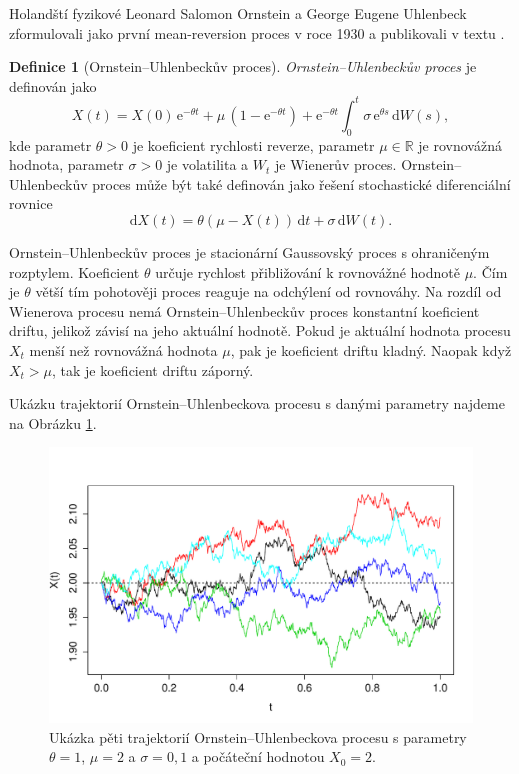 \documentclass[a4paper,12pt]{report}
\theoremstyle{definition} \newtheorem{definice}[veta]{Definice}
\theoremstyle{remark}
\begin{document}
Holandští fyzikové Leonard Salomon Ornstein a George Eugene Uhlenbeck zformulovali jako první mean-reversion proces v roce 1930 a publikovali v textu \cite{OrnsteinUhlenbeck1930}. 

\begin{definice}[Ornstein–Uhlenbeckův proces]
\textit{Ornstein–Uhlenbeckův proces} je definován jako
\begin{equation}\label{OUP}
X(t) = X(0)\,\mathrm{e}^{-\theta t} + \mu\,(1-\mathrm{e}^{-\theta t}) + \mathrm{e}^{-\theta t}\int_0^t \sigma\,\mathrm{e}^{\theta s}\,\mathrm{d}W(s),
\end{equation}
kde parametr $\theta>0$ je koeficient rychlosti reverze, parametr $\mu\in\mathbb{R}$ je rovnovážná hodnota, parametr $\sigma>0$ je volatilita a $W_t$ je Wienerův proces.
Ornstein–Uhlenbeckův proces může být také definován jako řešení stochastické diferenciální rovnice
\begin{equation}\label{SDE_OUP}
\mathrm{d}X(t) = \theta(\mu-X(t))\,\mathrm{d}t + \sigma\,\mathrm{d}W(t).
\end{equation}
\end{definice}

Ornstein–Uhlenbeckův proces je stacionární Gaussovský proces s ohraničeným rozptylem. 
Koeficient $\theta$ určuje rychlost přibližování k rovnovážné hodnotě $\mu$. %
Čím je $\theta$ větší tím pohotověji proces reaguje na odchýlení od rovnováhy. 
Na rozdíl od Wienerova procesu nemá Ornstein–Uhlenbeckův proces konstantní koeficient driftu, jelikož závisí na jeho aktuální hodnotě.
Pokud je aktuální hodnota procesu $X_t$ menší než rovnovážná hodnota $\mu$, pak je koeficient driftu kladný.
Naopak když $X_t>\mu$, tak je koeficient driftu záporný.

Ukázku trajektorií Ornstein–Uhlenbeckova procesu s danými parametry najdeme na Obrázku \ref{OU_graf}.

\begin{figure}[!htbp]
  \centering 
	\includegraphics[width=13.5cm, clip, trim= 0 15 25 50]{IMG/OU_v4.pdf}
  \caption{Ukázka pěti trajektorií Ornstein–Uhlenbeckova procesu s parametry $\theta=1$, $\mu=2$ a  $\sigma=0,1$ a počáteční hodnotou $X_0=2$.}  \label{OU_graf}
\end{figure}
\end{document}
